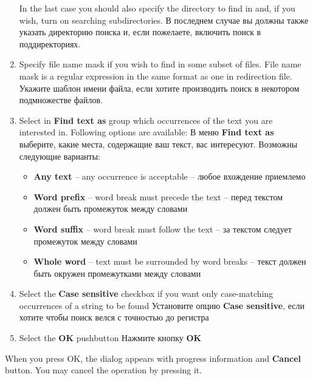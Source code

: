 \begin{enumerate}
       \ifenglish
      In the last case you should also specify the directory to find in
      and, if you wish, turn on searching subdirectories.
      \else
      В последнем случае вы должны также указать директорию поиска и, 
      если пожелаете, включить поиск в поддиректориях.
      \fi
\item \ifenglish
      Specify file name mask if you wish to find in some subset of files.
      File name mask is a regular expression in the same format as one in
      redirection file.
      \else
      Укажите шаблон имени файла, если хотите производить поиск в некотором
      подмножестве файлов.
      \fi
\item \ifenglish
      Select in {\bf Find text as} group which occurrences of the text you are interested in.
      Following options are available:
      \else
      В меню {\bf Find text as} выберите, какие места, содержащие ваш текст, вас 
      интересуют.
      Возможны следующие варианты:
      \fi
      \begin{itemize}
      \item {\bf Any text} 
      \ifenglish 
      -- any occurrence is acceptable
      \else
      -- любое вхождение приемлемо
      \fi
      \item {\bf Word prefix} 
       \ifenglish
       -- word break must precede the text
       \else
       -- перед текстом должен быть промежуток между словами
       \fi
      \item {\bf Word suffix} 
       \ifenglish
       -- word break must follow the text
       \else
       -- за текстом следует промежуток между словами
       \fi
      \item {\bf Whole word} 
       \ifenglish
       -- text must be surrounded by word breaks
       \else
       -- текст должен быть окружен промежутками между словами
       \fi
      \end{itemize}
\item 
      \ifenglish
      Select the {\bf Case sensitive} checkbox if you want only
      case-matching occurrences of a string to be found
      \else
      Установите опцию {\bf Case sensitive}, если хотите чтобы поиск велся 
      с точностью до регистра
      \fi
\item 
      \ifenglish
      Select the {\bf OK} pushbutton
      \else
      Нажмите кнопку {\bf OK}
      \fi
\end{enumerate}

\ifenglish
When you press OK, the dialog appears with progress information and {\bf Cancel}
button. You may cancel the operation by pressing it.

